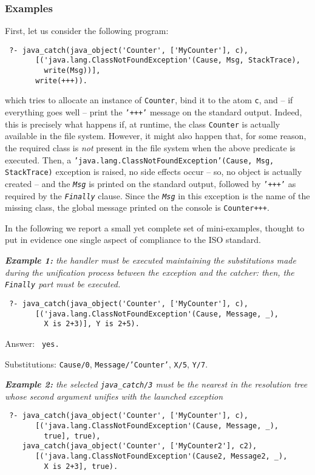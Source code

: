 \subsubsection{Examples}\label{ssec:jexamples}
First, let us consider the following program:
\begin{verbatim}
 ?- java_catch(java_object('Counter', ['MyCounter'], c),
       [('java.lang.ClassNotFoundException'(Cause, Msg, StackTrace),
         write(Msg))],
       write(+++)).
\end{verbatim}
which tries to allocate an instance of \texttt{Counter}, bind it to the atom \texttt{c}, and -- if
everything goes well -- print the \texttt{'+++'} message on the standard output.
%
Indeed, this is precisely what happens if, at runtime, the class \texttt{Counter} is actually
available in the file system. However, it might also happen that, for some reason, the required
class is \textit{not} present in the file system when the above predicate is executed. Then, a
\texttt{'java.lang.ClassNotFoundException'(Cause, Msg, StackTrace)} exception is raised, no side
effects occur -- so, no object is actually created -- and the \texttt{\textit{Msg}} is printed on
the standard output, followed by \texttt{'+++'} as required by the \texttt{\textit{Finally}}
clause. Since the \texttt{\textit{Msg}} in this exception is the name of the missing class, the
global message printed on the console is \texttt{Counter+++}.

\smallskip
In the following we report a small yet complete set of mini-examples, thought to put in evidence
one single aspect of \tuprolog{} compliance to the ISO standard.

\medskip
\textit{\textbf{Example 1:} the handler must be executed maintaining the substitutions made during
the unification process between the exception and the catcher: then, the \texttt{Finally} part
must be executed.}
\begin{verbatim}
 ?- java_catch(java_object('Counter', ['MyCounter'], c),
       [('java.lang.ClassNotFoundException'(Cause, Message, _),
         X is 2+3)], Y is 2+5).
\end{verbatim}

Answer: \texttt{ yes.}

Substitutions: \texttt{Cause/0}, \texttt{Message/'Counter'}, \texttt{X/5}, \texttt{Y/7}.

\medskip
\textit{\textbf{Example 2:} the selected \texttt{java\_catch/3} must be the nearest in the
resolution tree whose second argument unifies with the launched exception}
\begin{verbatim}
 ?- java_catch(java_object('Counter', ['MyCounter'], c),
       [('java.lang.ClassNotFoundException'(Cause, Message, _),
         true], true),
    java_catch(java_object('Counter', ['MyCounter2'], c2),
       [('java.lang.ClassNotFoundException'(Cause2, Message2, _),
         X is 2+3], true).
\end{verbatim}

